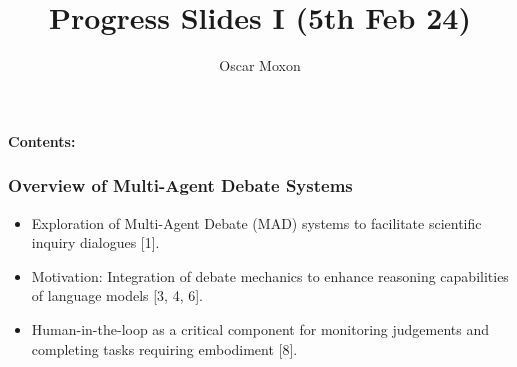 \documentclass{beamer}
\title{Progress Slides I (5th Feb 24)}
\author{Oscar Moxon}
\institute{King's College London}
\begin{document}
\begin{frame}
\titlepage
\end{frame}

\begin{frame}
    \textbf{Contents:}
    \frametitle{Overview of Multi-Agent Debate Systems}
    \begin{itemize}
        \item Exploration of Multi-Agent Debate (MAD) systems to facilitate scientific inquiry dialogues [1].
        \vspace{5mm}
        \item Motivation: Integration of debate mechanics to enhance reasoning capabilities of language models [3, 4, 6].
        \vspace{5mm}
        \item Human-in-the-loop as a critical component for monitoring judgements and completing tasks requiring embodiment [8].
    \end{itemize}
\end{frame}
\end{document}
